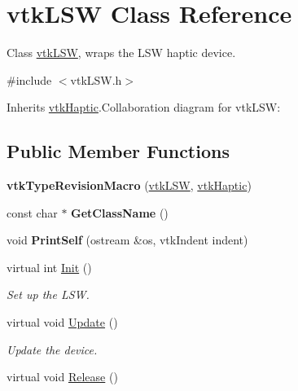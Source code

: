 \hypertarget{classvtkLSW}{
\section{vtkLSW Class Reference}
\label{classvtkLSW}
}


Class \hyperlink{classvtkLSW}{vtkLSW}, wraps the LSW haptic device.  


{\ttfamily \#include $<$vtkLSW.h$>$}

Inherits \hyperlink{classvtkHaptic}{vtkHaptic}.Collaboration diagram for vtkLSW:\subsection*{Public Member Functions}
\begin{DoxyCompactItemize}
\item 
\hypertarget{classvtkLSW_ad0c5588c72275ae36e0e108fab2c8c15}{
{\bfseries vtkTypeRevisionMacro} (\hyperlink{classvtkLSW}{vtkLSW}, \hyperlink{classvtkHaptic}{vtkHaptic})}
\label{classvtkLSW_ad0c5588c72275ae36e0e108fab2c8c15}

\item 
\hypertarget{classvtkLSW_afffd79f78a40160ea9a62c1bad094ddc}{
const char $\ast$ {\bfseries GetClassName} ()}
\label{classvtkLSW_afffd79f78a40160ea9a62c1bad094ddc}

\item 
\hypertarget{classvtkLSW_a001db882f577554862a9aeb2738640c4}{
void {\bfseries PrintSelf} (ostream \&os, vtkIndent indent)}
\label{classvtkLSW_a001db882f577554862a9aeb2738640c4}

\item 
\hypertarget{classvtkLSW_a9de1e9f2b2e3a2ad0e7a92b1597ab2f7}{
virtual int \hyperlink{classvtkLSW_a9de1e9f2b2e3a2ad0e7a92b1597ab2f7}{Init} ()}
\label{classvtkLSW_a9de1e9f2b2e3a2ad0e7a92b1597ab2f7}

\begin{DoxyCompactList}\small\item\em Set up the LSW. \item\end{DoxyCompactList}\item 
\hypertarget{classvtkLSW_ade67f3385b72c50988016692a03e97ae}{
virtual void \hyperlink{classvtkLSW_ade67f3385b72c50988016692a03e97ae}{Update} ()}
\label{classvtkLSW_ade67f3385b72c50988016692a03e97ae}

\begin{DoxyCompactList}\small\item\em Update the device. \item\end{DoxyCompactList}\item 
\hypertarget{classvtkLSW_a69520b1ae3e7549094ba60eb55a41cdf}{
virtual void \hyperlink{classvtkLSW_a69520b1ae3e7549094ba60eb55a41cdf}{Release} ()}
\label{classvtkLSW_a69520b1ae3e7549094ba60eb55a41cdf}


\end{DoxyCompactItemize}
